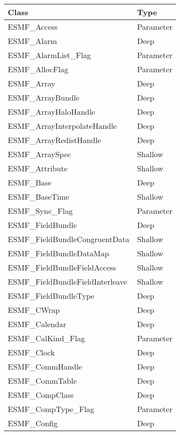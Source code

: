 \begin{table}[t]
\begin{tabular}{ll}

{\bf Class} & {\bf Type} \\ \hline

ESMF\_Access               &  Parameter \\
ESMF\_Alarm                &  Deep \\
ESMF\_AlarmList\_Flag      & Parameter \\
ESMF\_AllocFlag            &  Parameter \\
ESMF\_Array                & Deep \\
ESMF\_ArrayBundle          &  Deep \\
ESMF\_ArrayHaloHandle       & Deep \\
ESMF\_ArrayInterpolateHandle & Deep \\
ESMF\_ArrayRedistHandle     & Deep \\
ESMF\_ArraySpec             & Shallow\\
ESMF\_Attribute             & Shallow\\
ESMF\_Base                  & Deep \\
ESMF\_BaseTime              & Shallow\\
ESMF\_Sync\_Flag          & Parameter \\
ESMF\_FieldBundle                & Deep \\
ESMF\_FieldBundleCongruentData   & Shallow\\
ESMF\_FieldBundleDataMap         & Shallow\\
ESMF\_FieldBundleFieldAccess     & Shallow\\
ESMF\_FieldBundleFieldInterleave & Shallow\\
ESMF\_FieldBundleType            & Deep \\ 
ESMF\_CWrap                 & Deep \\
ESMF\_Calendar              & Deep \\
ESMF\_CalKind\_Flag         & Parameter \\
ESMF\_Clock                 & Deep \\
ESMF\_CommHandle            & Deep \\
ESMF\_CommTable             & Deep \\
ESMF\_CompClass             & Deep \\
ESMF\_CompType\_Flag              & Parameter \\
ESMF\_Config                & Deep \\

\end{tabular}
\end{table}
